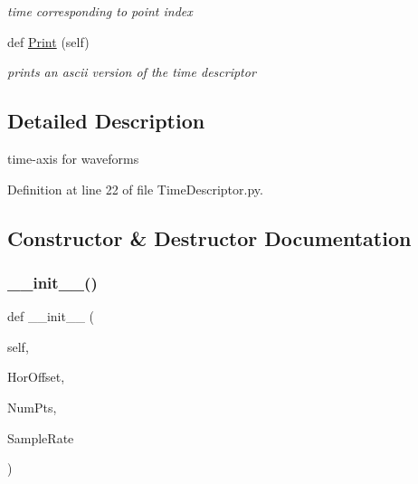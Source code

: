 \begin{DoxyCompactItemize}
\begin{DoxyCompactList}\small\item\em time corresponding to point index \end{DoxyCompactList}\item 
\mbox{\label{classSignalIntegrity_1_1TimeDomain_1_1Waveform_1_1TimeDescriptor_1_1TimeDescriptor_a0203fc9c617eec80ba28741251ee3b86}} 
def \hyperlink{classSignalIntegrity_1_1TimeDomain_1_1Waveform_1_1TimeDescriptor_1_1TimeDescriptor_a0203fc9c617eec80ba28741251ee3b86}{Print} (self)
\begin{DoxyCompactList}\small\item\em prints an ascii version of the time descriptor \end{DoxyCompactList}\end{DoxyCompactItemize}


\subsection{Detailed Description}
time-\/axis for waveforms 

Definition at line 22 of file Time\+Descriptor.\+py.



\subsection{Constructor \& Destructor Documentation}
\mbox{\label{classSignalIntegrity_1_1TimeDomain_1_1Waveform_1_1TimeDescriptor_1_1TimeDescriptor_a82ea8eeea7b21f9766fa212014721486}} 
\subsubsection{\texorpdfstring{\+\_\+\+\_\+init\+\_\+\+\_\+()}{\_\_init\_\_()}}
{\footnotesize\ttfamily def \+\_\+\+\_\+init\+\_\+\+\_\+ (\begin{DoxyParamCaption}\item[{}]{self,  }\item[{}]{Hor\+Offset,  }\item[{}]{Num\+Pts,  }\item[{}]{Sample\+Rate }\end{DoxyParamCaption})}



